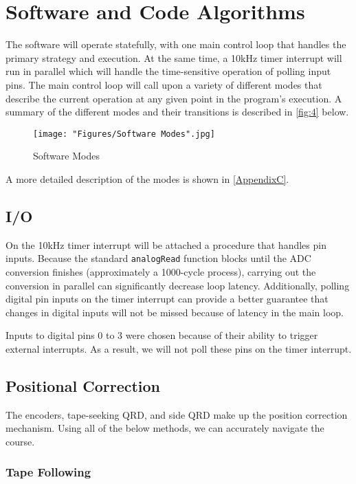 \documentclass[11pt, oneside]{article} %
\begin{document}
\newpage
\section{Software and Code Algorithms}	
The software will operate statefully, with one main control loop that handles the primary strategy and execution. At the same time, a 10kHz timer interrupt will run in parallel which will handle the time-sensitive operation of polling input pins.
The main control loop will call upon a variety of different modes that describe the current operation at any given point in the program's execution. A summary of the different modes and their transitions is described in \autoref{fig:4} below.

\begin{figure}[h]
	\centering
	\texttt{[image: "Figures/Software Modes".jpg]}
	\caption[Software Modes]{Software Modes}
	\label{fig:4}
\end{figure}

A more detailed description of the modes is shown in \autoref{AppendixC}.
	\newpage
	\subsection{I/O}
	
	On the 10kHz timer interrupt will be attached a procedure that handles pin inputs. Because the standard \texttt{analogRead} function blocks until the ADC conversion finishes (approximately a 1000-cycle process), carrying out the conversion in parallel can significantly decrease loop latency. Additionally, polling digital pin inputs on the timer interrupt can provide a better guarantee that changes in digital inputs will not be missed because of latency in the main loop.
	
	Inputs to digital pins 0 to 3 were chosen because of their ability to trigger external interrupts. As a result, we will not poll these pins on the timer interrupt.
	
	\subsection{Positional Correction}
	
	The encoders, tape-seeking QRD, and side QRD make up the position correction mechanism. Using all of the below methods, we can accurately navigate the course.
	
		\subsubsection{Tape Following}
		
\end{document}
